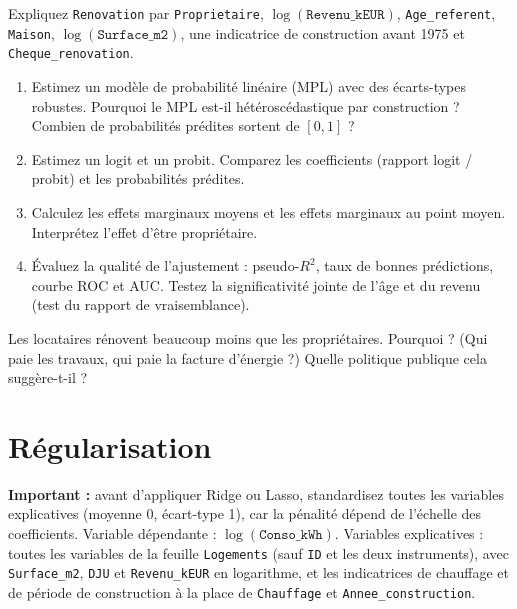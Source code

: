 \documentclass[11pt,a4paper]{article}
\newcommand{\var}[1]{\texttt{#1}}
\begin{document}
Expliquez \var{Renovation} par \var{Proprietaire}, $\log(\var{Revenu\_kEUR})$, \var{Age\_referent}, \var{Maison}, $\log(\var{Surface\_m2})$, une indicatrice de construction avant 1975 et \var{Cheque\_renovation}.
\begin{enumerate}
  \item Estimez un modèle de probabilité linéaire (MPL) avec des écarts-types robustes. Pourquoi le MPL est-il hétéroscédastique par construction ? Combien de probabilités prédites sortent de $[0,1]$ ?
  \item Estimez un logit et un probit. Comparez les coefficients (rapport logit / probit) et les probabilités prédites.
  \item Calculez les effets marginaux moyens et les effets marginaux au point moyen. Interprétez l'effet d'être propriétaire.
  \item Évaluez la qualité de l'ajustement : pseudo-$R^2$, taux de bonnes prédictions, courbe ROC et AUC. Testez la significativité jointe de l'âge et du revenu (test du rapport de vraisemblance).
\end{enumerate}

\begin{question}
Les locataires rénovent beaucoup moins que les propriétaires. Pourquoi ? (Qui paie les travaux, qui paie la facture d'énergie ?) Quelle politique publique cela suggère-t-il ?
\end{question}

\section{Régularisation}

\begin{afaire}
\textbf{Important :} avant d'appliquer Ridge ou Lasso, standardisez toutes les variables explicatives (moyenne 0, écart-type 1), car la pénalité dépend de l'échelle des coefficients. Variable dépendante : $\log(\var{Conso\_kWh})$. Variables explicatives : toutes les variables de la feuille \var{Logements} (sauf \var{ID} et les deux instruments), avec \var{Surface\_m2}, \var{DJU} et \var{Revenu\_kEUR} en logarithme, et les indicatrices de chauffage et de période de construction à la place de \var{Chauffage} et \var{Annee\_construction}.
\end{afaire}
\end{document}
